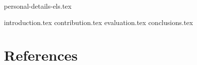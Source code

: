 \documentclass[twocolumn,preprint,3p,number]{elsarticle}
\theoremstyle{plain}
\theoremstyle{definition}
\begin{document}
	{personal-details-els.tex}

	{introduction.tex}
	{contribution.tex}
	{evaluation.tex}
	{conclusions.tex}


\section*{References}
        
	
	
\end{document}
